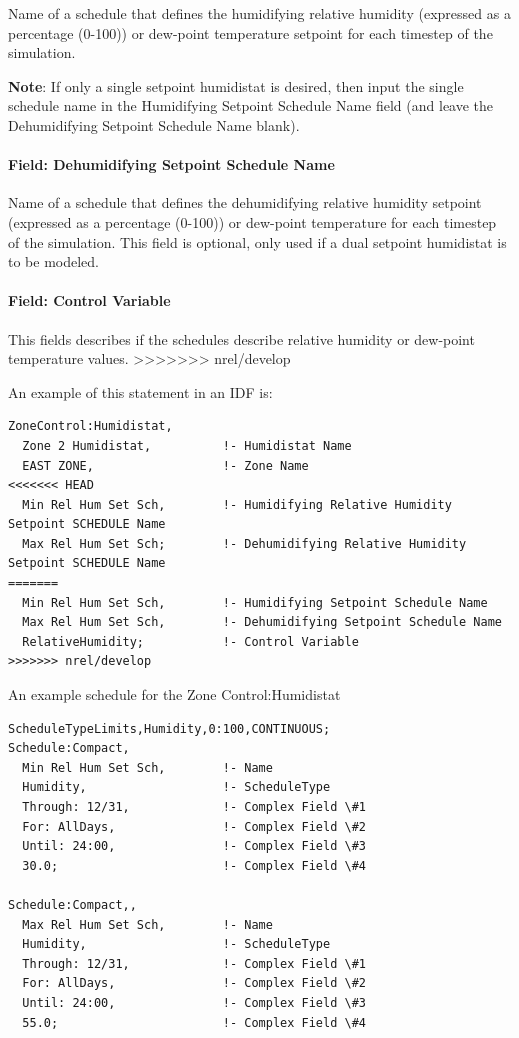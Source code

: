 Name of a schedule that defines the humidifying relative humidity (expressed as a percentage (0-100)) or dew-point temperature setpoint for each timestep of the simulation.

\textbf{Note}: If only a single setpoint humidistat is desired, then input the single schedule name in the Humidifying Setpoint Schedule Name field (and leave the Dehumidifying Setpoint Schedule Name blank).

\paragraph{Field: Dehumidifying Setpoint Schedule Name}\label{field-dehumidifying-setpoint-schedule-name-1}

Name of a schedule that defines the dehumidifying relative humidity setpoint (expressed as a percentage (0-100)) or dew-point temperature for each timestep of the simulation. This field is optional, only used if a dual setpoint humidistat is to be modeled.

\paragraph{Field: Control Variable}\label{field-humidistat-control-variable}

This fields describes if the schedules describe relative humidity or dew-point temperature values.
>>>>>>> nrel/develop

An example of this statement in an IDF is:

\begin{lstlisting}
ZoneControl:Humidistat,
  Zone 2 Humidistat,          !- Humidistat Name
  EAST ZONE,                  !- Zone Name
<<<<<<< HEAD
  Min Rel Hum Set Sch,        !- Humidifying Relative Humidity Setpoint SCHEDULE Name
  Max Rel Hum Set Sch;        !- Dehumidifying Relative Humidity Setpoint SCHEDULE Name
=======
  Min Rel Hum Set Sch,        !- Humidifying Setpoint Schedule Name
  Max Rel Hum Set Sch,        !- Dehumidifying Setpoint Schedule Name
  RelativeHumidity;           !- Control Variable
>>>>>>> nrel/develop
\end{lstlisting}

An example schedule for the Zone Control:Humidistat

\begin{lstlisting}
ScheduleTypeLimits,Humidity,0:100,CONTINUOUS;
Schedule:Compact,
  Min Rel Hum Set Sch,        !- Name
  Humidity,                   !- ScheduleType
  Through: 12/31,             !- Complex Field \#1
  For: AllDays,               !- Complex Field \#2
  Until: 24:00,               !- Complex Field \#3
  30.0;                       !- Complex Field \#4

Schedule:Compact,,
  Max Rel Hum Set Sch,        !- Name
  Humidity,                   !- ScheduleType
  Through: 12/31,             !- Complex Field \#1
  For: AllDays,               !- Complex Field \#2
  Until: 24:00,               !- Complex Field \#3
  55.0;                       !- Complex Field \#4
\end{lstlisting}

